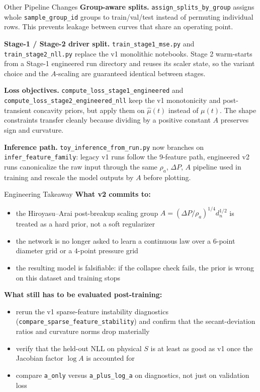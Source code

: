 \documentclass[UTF8,aspectratio=169]{ctexbeamer}
\begin{document}
\begin{frame}{Other Pipeline Changes}
\textbf{Group-aware splits.} \texttt{assign\_splits\_by\_group} assigns whole \texttt{sample\_group\_id} groups to train/val/test instead of permuting individual rows. This prevents leakage between curves that share an operating point.

\vspace{0.3em}
\textbf{Stage-1 / Stage-2 driver split.} \texttt{train\_stage1\_mse.py} and \texttt{train\_stage2\_nll.py} replace the v1 monolithic notebooks. Stage 2 warm-starts from a Stage-1 engineered run directory and reuses its scaler state, so the variant choice and the $A$-scaling are guaranteed identical between stages.

\vspace{0.3em}
\textbf{Loss objectives.} \texttt{compute\_loss\_stage1\_engineered} and \texttt{compute\_loss\_stage2\_engineered\_nll} keep the v1 monotonicity and post-transient concavity priors, but apply them on $\hat\mu(t)$ instead of $\mu(t)$. The shape constraints transfer cleanly because dividing by a positive constant $A$ preserves sign and curvature.

\vspace{0.3em}
\textbf{Inference path.} \texttt{toy\_inference\_from\_run.py} now branches on \texttt{infer\_feature\_family}: legacy v1 runs follow the 9-feature path, engineered v2 runs canonicalize the raw input through the same $\rho_a$, $\Delta P$, $A$ pipeline used in training and rescale the model outputs by $A$ before plotting.
\end{frame}

\begin{frame}{Engineering Takeaway}
\textbf{What v2 commits to:}
\begin{itemize}
  \item the Hiroyasu--Arai post-breakup scaling group $A=(\Delta P/\rho_a)^{1/4}d_n^{1/2}$ is treated as a hard prior, not a soft regularizer
  \item the network is no longer asked to learn a continuous law over a $6$-point diameter grid or a $4$-point pressure grid
  \item the resulting model is falsifiable: if the collapse check fails, the prior is wrong on this dataset and training stops
\end{itemize}

\vspace{0.4em}
\textbf{What still has to be evaluated post-training:}
\begin{itemize}
  \item rerun the v1 sparse-feature instability diagnostics (\texttt{compare\_sparse\_feature\_stability}) and confirm that the secant-deviation ratios and curvature norms drop materially
  \item verify that the held-out NLL on physical $S$ is at least as good as v1 once the Jacobian factor $\log A$ is accounted for
  \item compare \texttt{a\_only} versus \texttt{a\_plus\_log\_a} on diagnostics, not just on validation loss
\end{itemize}
\end{frame}
\end{document}
